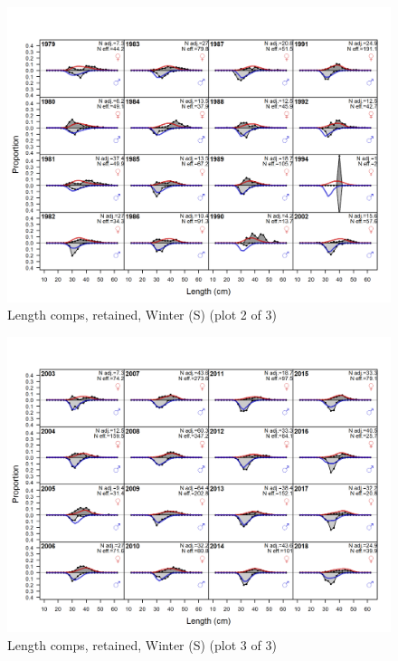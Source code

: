 \documentclass[12pt,]{article}
\begin{document}
\begin{figure}
\centering
\includegraphics{r4ss/plots_mod1/comp_lenfit_flt3mkt2_page2.png}
\caption{Length comps, retained, Winter (S) (plot 2 of 3)
\label{fig:length_fits}}
\end{figure}

\begin{figure}
\centering
\includegraphics{r4ss/plots_mod1/comp_lenfit_flt3mkt2_page3.png}
\caption{Length comps, retained, Winter (S) (plot 3 of 3)
\label{fig:length_fits}}
\end{figure}
\end{document}
